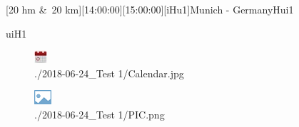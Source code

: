 \begin{minipage}{\textwidth}[20 hm \&~20 km][14:00:00][15:00:00][iHu1]{Munich - Germany}\label{2018-06-24-Test  1}Hui1







 uiH1





\end{minipage}\newline{}\begin{figure}\centering\includegraphics[angle=0,origin=c,height=0.25\textheight]{./Bilder/2018-06-24_Test  1/Calendar.jpg}\caption*{./2018-06-24\_Test  1/Calendar.jpg}\end{figure}\begin{figure}\centering\includegraphics[angle=0,origin=c,height=0.25\textheight]{./Bilder/2018-06-24_Test  1/PIC.png}\caption*{./2018-06-24\_Test  1/PIC.png}\end{figure}\vspace{2em} ~\newline 

